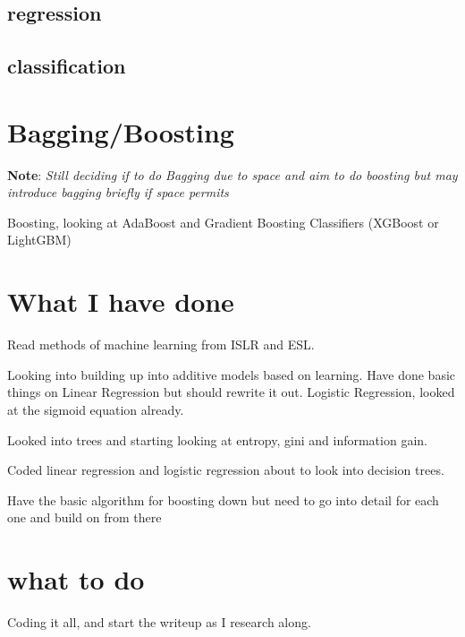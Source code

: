 \documentclass[11pt,a4paper]{article}
\begin{document}
\subsection{regression}

\subsection{classification}

\section{Bagging/Boosting}
\textbf{Note}: \textit{Still deciding if to do Bagging due to space and aim to do boosting but may introduce bagging briefly if space permits}

Boosting, looking at AdaBoost and Gradient Boosting Classifiers (XGBoost or LightGBM)


\section{What I have done}
Read methods of machine learning from ISLR and ESL.

Looking into building up into additive models based on learning. Have done basic things on Linear Regression but should rewrite it out. Logistic Regression, looked at the sigmoid equation already. 

Looked into trees and starting looking at entropy, gini and information gain.

Coded linear regression and logistic regression about to look into decision trees.

Have the basic algorithm for boosting down but need to go into detail for each one and build on from there


\section{what to do}
Coding it all, and start the writeup as I research along.
\end{document}
